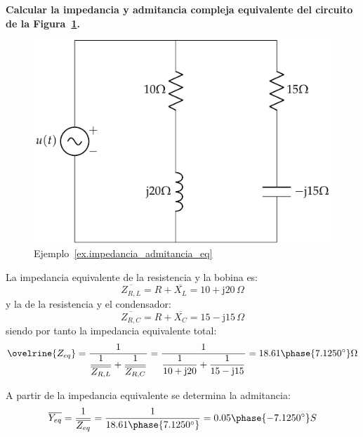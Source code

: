 \documentclass[11pt]{book} %
\begin{document}
	\begin{example}\label{ex.impedancia_admitancia_eq}
	    \textbf{Calcular la impedancia y admitancia compleja equivalente del circuito de la Figura~\ref{fig.impedancia_admitancia_eq}.}
	    \begin{figure}[H]
	        \centering
	        \includegraphics{../figs/impedancia_admitancia_eq.pdf}
	        \caption{Ejemplo~\ref{ex.impedancia_admitancia_eq}}
	        \label{fig.impedancia_admitancia_eq}
	    \end{figure}
	    
	    La impedancia equivalente de la resistencia y la bobina es:
	    \begin{equation*}
	        \overline{Z_{R,L}}=R+\overline{X_L}=10+\mathrm{j}20\,\Omega
	    \end{equation*}
	    y la de la resistencia y el condensador: 
	    \begin{equation*}
	        \overline{Z_{R,C}}=R+\overline{X_C}=15-\mathrm{j}15\,\Omega
	    \end{equation*}
	    siendo por tanto la impedancia equivalente total: 
	    \begin{equation*}
	        \ovelrine{Z_{eq}}=\dfrac{1}{\dfrac{1}{\overline{Z_{R,L}}}+\dfrac{1}{\overline{Z_{R,C}}}}= \dfrac{1}{\dfrac{1}{10+\mathrm{j}20}+\dfrac{1}{15-\mathrm{j}15}}=18.61\phase{7.1250^\circ}\Omega
	    \end{equation*}
	    
	    A partir de la impedancia equivalente se determina la admitancia: 
	    \begin{equation*}
	        \overline{Y_{eq}}=\dfrac{1}{\overline{Z_{eq}}}=\dfrac{1}{18.61\phase{7.1250^\circ}}=0.05\phase{-7.1250^\circ} S
	    \end{equation*}
	\end{example}
	
\end{document}
